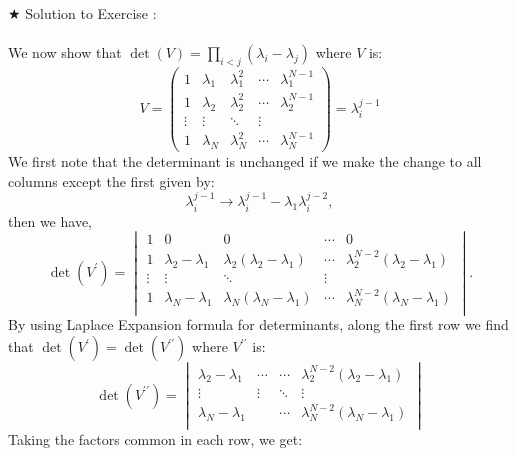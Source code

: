 \documentclass[11pt]{article}
\begin{document}
\noindent $\bigstar$ Solution to Exercise :
\\ \\ 
We now show that $\det(V) = \prod_{i<j} (\lambda_i - \lambda_j)$ where $V$ is: 
\begin{equation*}
	V = 
	\begin{pmatrix}
		1 & \lambda_1 & \lambda_{1}^{2} & \cdots & \lambda_{1}^{N-1} \\
		1 & \lambda_2 & \lambda_{2}^{2} & \cdots & \lambda_{2}^{N-1} \\ 
		\vdots  & \vdots  & \ddots & \vdots  \\
		1 & \lambda_N & \lambda_{N}^{2} & \cdots & \lambda_{N}^{N-1} 
	\end{pmatrix} = \lambda_{i}^{j-1} 
\end{equation*}
We first note that the determinant is unchanged
if we make the change to all columns except the first given by:
\begin{equation}
	\lambda_{i}^{j-1} \to \lambda_{i}^{j-1} - \lambda_{1} \lambda_{i}^{j-2},
\end{equation}
then we have, 
\begin{equation}
	\det(V^{\prime}) = 
	\begin{vmatrix}
		1 & 0 & 0 & \cdots & 0 \\
		1 & \lambda_2 - \lambda_1 & \lambda_2(\lambda_2 - \lambda_1) & \cdots & \lambda_2^{N-2}(\lambda_2 - \lambda_1) \\ 
		\vdots  & \vdots  & \ddots & \vdots  \\
		1 & \lambda_N - \lambda_1 & \lambda_N(\lambda_N - \lambda_1) & \cdots & \lambda_N^{N-2}(\lambda_N - \lambda_1) \\
	\end{vmatrix}.
\end{equation}
By using Laplace Expansion formula for determinants, along the first row we find that $\det(V^{\prime}) = \det(V^{\prime\prime})$ where $V^{\prime\prime}$ is:
\begin{equation}
	\det(V^{\prime\prime}) = 
	\begin{vmatrix}
		 \lambda_2 - \lambda_1 & \cdots & \cdots & \lambda_2^{N-2}(\lambda_2 - \lambda_1) \\ 
		\vdots  & \vdots  & \ddots & \vdots  \\
		\lambda_N - \lambda_1 &  & \cdots &  \lambda_N^{N-2}(\lambda_N - \lambda_1) \\
	\end{vmatrix}
\end{equation}
Taking the factors common in each row, we get:
\end{document}
